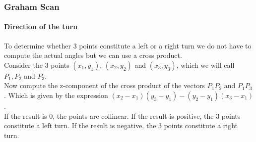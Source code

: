 \begin{frame}
\frametitle{Graham Scan}
\framesubtitle{Direction of the turn}
To determine whether 3 points constitute a left or a right turn we do not have to compute the actual angles but we can use a cross product.\\
Consider the 3 points $(x_{1}, y_{1})$,  $(x_{2}, y_{2})$ and $(x_{3}, y_{3})$, which we will call $P_{1}, P_{2}$ and $P_{3}$.\\
Now compute the z-component of the cross product of the vectors $P_{1}P_{2}$ and $P_{1}P_{3}$. Which is given by the expression $(x_{2}-x_{1})(y_{3}-y_{1})-(y_{2}-y_{1})(x_{3}-x_{1})$.\\
If the result is 0, the points are collinear. If the result is positive, the 3 points constitute a left turn. If the result is negative, the 3 points constitute a right turn.
\end{frame}